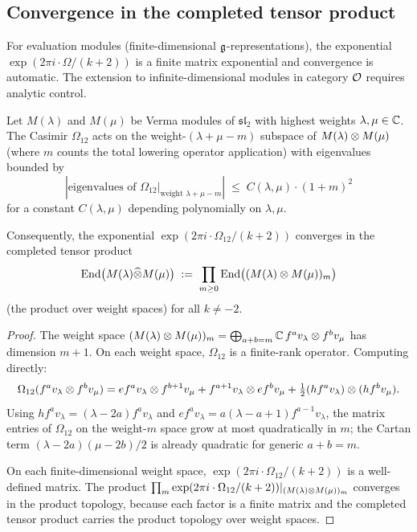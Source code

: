 \subsection{Convergence in the completed tensor product}
\label{subsec:convergence}

For evaluation modules (finite-dimensional $\mathfrak{g}$-representations), the exponential $\exp(2\pi i \cdot \Omega/(k+2))$ is a finite matrix exponential and convergence is automatic. The extension to infinite-dimensional modules in category $\mathcal{O}$ requires analytic control.

\begin{proposition}
\label{prop:convergence-verma}
Let $M(\lambda)$ and $M(\mu)$ be Verma modules of $\mathfrak{sl}_2$ with highest weights $\lambda, \mu \in \mathbb C$. The Casimir $\Omega_{12}$ acts on the weight-$(\lambda + \mu - m)$ subspace of $M(\lambda) \otimes M(\mu)$ (where $m$ counts the total lowering operator application) with eigenvalues bounded by
\[
 |\text{eigenvalues of } \Omega_{12}\big|_{\text{weight } \lambda+\mu-m}|
 \;\leq\;
 C(\lambda,\mu) \cdot (1+m)^2
\]
for a constant $C(\lambda,\mu)$ depending polynomially on $\lambda, \mu$.

Consequently, the exponential $\exp(2\pi i \cdot \Omega_{12}/(k+2))$ converges in the completed tensor product
\[
 \mathrm{End}\bigl(M(\lambda) \widehat\otimes M(\mu)\bigr) \;:=\; \prod_{m \geq 0} \mathrm{End}\bigl((M(\lambda) \otimes M(\mu))_m\bigr)
\]
(the product over weight spaces) for all $k \neq -2$.
\end{proposition}

\begin{proof}
The weight space $(M(\lambda) \otimes M(\mu))_m = \bigoplus_{a+b=m} \mathbb C\,f^a v_\lambda \otimes f^b v_\mu$ has dimension $m+1$. On each weight space, $\Omega_{12}$ is a finite-rank operator. Computing directly:
\[
 \Omega_{12}(f^a v_\lambda \otimes f^b v_\mu)
 = e f^a v_\lambda \otimes f^{b+1} v_\mu + f^{a+1} v_\lambda \otimes e f^b v_\mu
 + \tfrac{1}{2}(h f^a v_\lambda) \otimes (h f^b v_\mu).
\]
Using $h f^a v_\lambda = (\lambda - 2a) f^a v_\lambda$ and $e f^a v_\lambda = a(\lambda - a + 1) f^{a-1} v_\lambda$, the matrix entries of $\Omega_{12}$ on the weight-$m$ space grow at most quadratically in $m$; the Cartan term
$(\lambda - 2a)(\mu - 2b)/2$ is already quadratic for generic
$a+b=m$.

On each finite-dimensional weight space, $\exp(2\pi i \cdot \Omega_{12}/(k+2))$ is a well-defined matrix. The product $\prod_m \exp(2\pi i \cdot \Omega_{12}/(k+2))|_{(M(\lambda) \otimes M(\mu))_m}$ converges in the product topology, because each factor is a finite matrix and the completed tensor product carries the product topology over weight spaces.
\end{proof}

